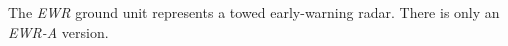 
The \emph{EWR} ground unit represents a towed early-warning radar. There is only an \emph{EWR-A} version.
